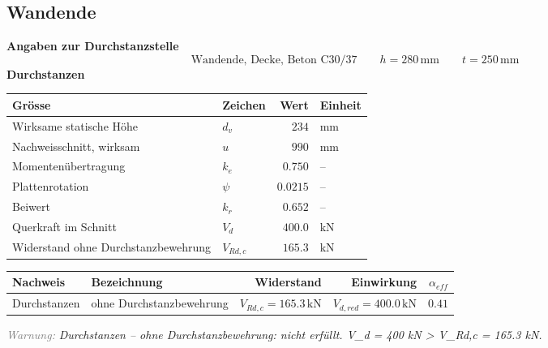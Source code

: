 \documentclass[11pt,a4paper]{article}
\newcommand{\hinweis}[2]{\par\noindent\textcolor{gray}{\textit{#1:}} \textit{#2}\par}
\begin{document}
\subsection{Wandende}
\noindent\textbf{Angaben zur Durchstanzstelle}
\begin{equation*}
\text{Wandende, Decke, Beton C30/37} \qquad h = 280\,\mathrm{mm} \qquad t = 250\,\mathrm{mm}
\end{equation*}
\noindent\textbf{Durchstanzen}
\begin{longtable}{llrl}
\hline
Grösse & Zeichen & Wert & Einheit \\
\hline
\endhead
Wirksame statische Höhe & $d_v$ & $234$ & mm \\
Nachweisschnitt, wirksam & $u$ & $990$ & mm \\
Momentenübertragung & $k_e$ & $0.750$ & – \\
Plattenrotation & $\psi$ & $0.0215$ & – \\
Beiwert & $k_r$ & $0.652$ & – \\
Querkraft im Schnitt & $V_d$ & $400.0$ & kN \\
Widerstand ohne Durchstanzbewehrung & $V_{Rd,c}$ & $165.3$ & kN \\
\hline
\end{longtable}
\begin{xltabular}{\linewidth}{>{\raggedright\arraybackslash}X>{\raggedright\arraybackslash}Xrrr}
\hline
Nachweis & Bezeichnung & Widerstand & Einwirkung & $\alpha_{eff}$ \\
\hline
\endhead
Durchstanzen & ohne Durchstanzbewehrung & $V_{Rd,c} = 165.3\,\mathrm{kN}$ & $V_{d,red} = 400.0\,\mathrm{kN}$ & $0.41$ \\
\hline
\end{xltabular}
\hinweis{Warnung}{Durchstanzen – ohne Durchstanzbewehrung: nicht erfüllt. V\_d = 400 kN > V\_Rd,c = 165.3 kN.}
\end{document}
